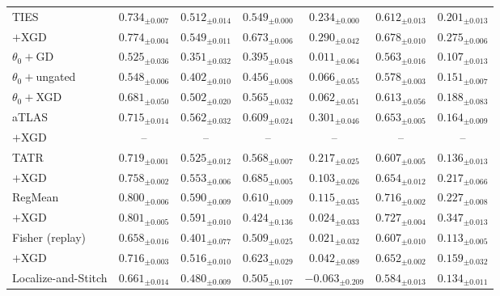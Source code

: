 \documentclass{article} %
\newcommand{\thetab}{\theta_0}
\begin{document}
\begin{table}[t]
\begin{tabular}{lcccccc}
TIES                     & $0.734_{\pm0.007}$ & $0.512_{\pm0.014}$ & $0.549_{\pm0.000}$ & $0.234_{\pm0.000}$ & $0.612_{\pm0.013}$ & $0.201_{\pm0.013}$ \\
\quad $+$XGD             & $0.774_{\pm0.004}$ & $0.549_{\pm0.011}$ & $0.673_{\pm0.006}$ & $0.290_{\pm0.042}$ & $0.678_{\pm0.010}$ & $0.275_{\pm0.006}$ \\
\midrule
$\thetab+$GD             & $0.525_{\pm0.036}$ & $0.351_{\pm0.032}$ & $0.395_{\pm0.048}$ & $0.011_{\pm0.064}$ & $0.563_{\pm0.016}$ & $0.107_{\pm0.013}$ \\
$\thetab+$ungated        & $0.548_{\pm0.006}$ & $0.402_{\pm0.010}$ & $0.456_{\pm0.008}$ & $0.066_{\pm0.055}$ & $0.578_{\pm0.003}$ & $0.151_{\pm0.007}$ \\
$\thetab+$XGD            & $0.681_{\pm0.050}$ & $0.502_{\pm0.020}$ & $0.565_{\pm0.032}$ & $0.062_{\pm0.051}$ & $0.613_{\pm0.056}$ & $0.188_{\pm0.083}$ \\
\midrule
aTLAS                    & $0.715_{\pm0.014}$ & $0.562_{\pm0.032}$ & $0.609_{\pm0.024}$ & $\mathbf{0.301}_{\pm0.046}$ & $0.653_{\pm0.005}$ & $0.164_{\pm0.009}$ \\
\quad $+$XGD             & -- & -- & -- & -- & -- & -- \\
TATR                     & $0.719_{\pm0.001}$ & $0.525_{\pm0.012}$ & $0.568_{\pm0.007}$ & $0.217_{\pm0.025}$ & $0.607_{\pm0.005}$ & $0.136_{\pm0.013}$ \\
\quad $+$XGD             & $0.758_{\pm0.002}$ & $0.553_{\pm0.006}$ & $\mathbf{0.685}_{\pm0.005}$ & $0.103_{\pm0.026}$ & $0.654_{\pm0.012}$ & $0.217_{\pm0.066}$ \\
RegMean                  & $0.800_{\pm0.006}$ & $0.590_{\pm0.009}$ & $0.610_{\pm0.009}$ & $0.115_{\pm0.035}$ & $0.716_{\pm0.002}$ & $0.227_{\pm0.008}$ \\
\quad $+$XGD             & $\mathbf{0.801}_{\pm0.005}$ & $\mathbf{0.591}_{\pm0.010}$ & $0.424_{\pm0.136}$ & $0.024_{\pm0.033}$ & $\mathbf{0.727}_{\pm0.004}$ & $\mathbf{0.347}_{\pm0.013}$ \\
Fisher (replay)          & $0.658_{\pm0.016}$ & $0.401_{\pm0.077}$ & $0.509_{\pm0.025}$ & $0.021_{\pm0.032}$ & $0.607_{\pm0.010}$ & $0.113_{\pm0.005}$ \\
\quad $+$XGD             & $0.716_{\pm0.003}$ & $0.516_{\pm0.010}$ & $0.623_{\pm0.029}$ & $0.042_{\pm0.089}$ & $0.652_{\pm0.002}$ & $0.159_{\pm0.032}$ \\
Localize-and-Stitch      & $0.661_{\pm0.014}$ & $0.480_{\pm0.009}$ & $0.505_{\pm0.107}$ & $-0.063_{\pm0.209}$ & $0.584_{\pm0.013}$ & $0.134_{\pm0.011}$ \\

\end{tabular}
\end{table}
\end{document}
